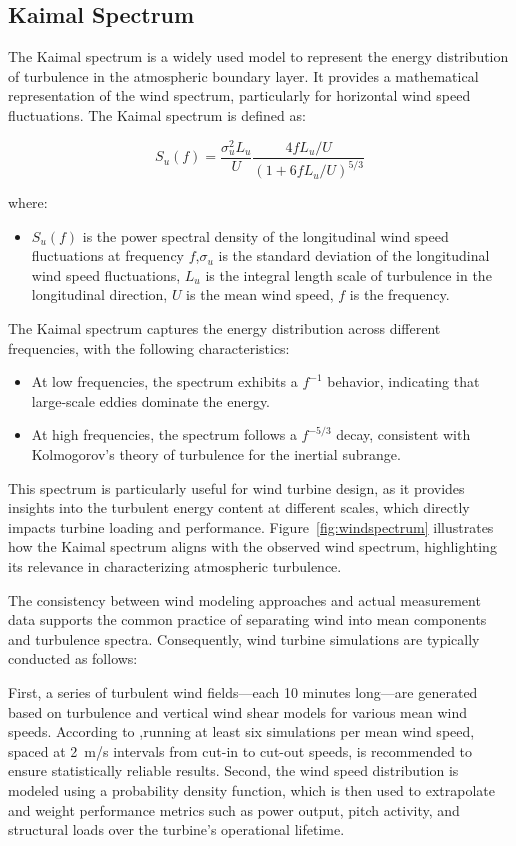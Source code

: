 \subsection{Kaimal Spectrum}
The Kaimal spectrum is a widely used model to represent the energy distribution of turbulence in the atmospheric boundary layer. It provides a mathematical representation of the wind spectrum, particularly for horizontal wind speed fluctuations. The Kaimal spectrum is defined as:

\begin{equation}
S_u(f) = \frac{\sigma_u^2 L_u}{U} \frac{4fL_u/U}{\left(1 + 6fL_u/U\right)^{5/3}}
\end{equation}

where:
\begin{itemize}
    \item $S_u(f)$ is the power spectral density of the longitudinal wind speed fluctuations at frequency $f$,$\sigma_u$ is the standard deviation of the longitudinal wind speed fluctuations, $L_u$ is the integral length scale of turbulence in the longitudinal direction, $U$ is the mean wind speed, $f$ is the frequency.
\end{itemize}

The Kaimal spectrum captures the energy distribution across different frequencies, with the following characteristics:
\begin{itemize}
    \item At low frequencies, the spectrum exhibits a $f^{-1}$ behavior, indicating that large-scale eddies dominate the energy.
    \item At high frequencies, the spectrum follows a $f^{-5/3}$ decay, consistent with Kolmogorov's theory of turbulence for the inertial subrange.
\end{itemize}

This spectrum is particularly useful for wind turbine design, as it provides insights into the turbulent energy content at different scales, which directly impacts turbine loading and performance. Figure~\ref{fig:windspectrum} illustrates how the Kaimal spectrum aligns with the observed wind spectrum, highlighting its relevance in characterizing atmospheric turbulence.

The consistency between wind modeling approaches and actual measurement data supports the common practice of separating wind into mean components and turbulence spectra. Consequently, wind turbine simulations are typically conducted as follows: 

First, a series of turbulent wind fields—each 10 minutes long—are generated based on turbulence and vertical wind shear models for various mean wind speeds. According to \cite{iec61400},running at least six simulations per mean wind speed, spaced at 2~m/s intervals from cut-in to cut-out speeds, is recommended to ensure statistically reliable results. Second, the wind speed distribution is modeled using a probability density function, which is then used to extrapolate and weight performance metrics such as power output, pitch activity, and structural loads over the turbine's operational lifetime.

